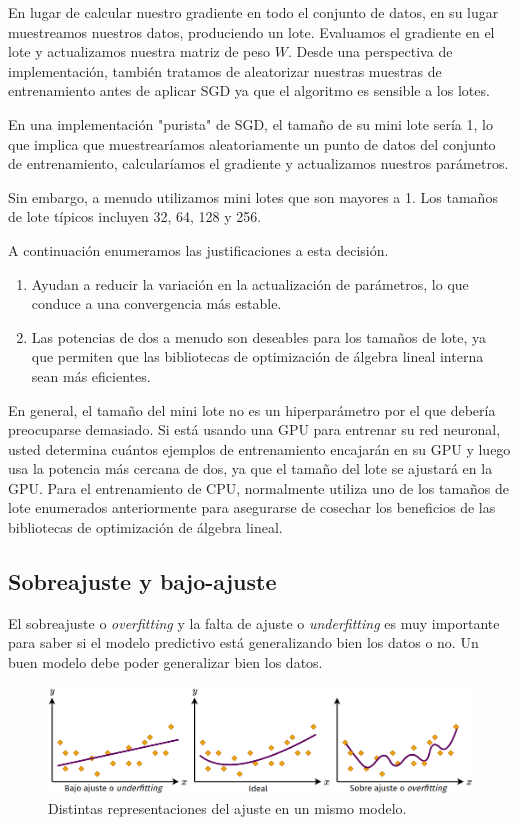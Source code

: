 \documentclass[a4paper,12pt]{article}
\begin{document}
En lugar de calcular nuestro gradiente en todo el conjunto de datos, en su lugar muestreamos nuestros datos, produciendo un lote. Evaluamos el gradiente en el lote y actualizamos nuestra matriz de peso $W$. Desde una perspectiva de implementación, también tratamos de aleatorizar nuestras muestras de entrenamiento antes de aplicar SGD ya que el algoritmo es sensible a los lotes.

En una implementación "purista" de SGD, el tamaño de su mini lote sería 1, lo que implica que muestrearíamos aleatoriamente un punto de datos del conjunto de entrenamiento, calcularíamos el gradiente
y actualizamos nuestros parámetros.

Sin embargo, a menudo utilizamos mini lotes que son mayores a 1. Los tamaños de lote típicos incluyen 32, 64, 128 y 256.

A continuación enumeramos las justificaciones a esta decisión.

\begin{enumerate}[noitemsep, topsep=2pt]
	\item Ayudan a reducir la variación en la actualización de parámetros, lo que conduce a una convergencia más estable. 
	\item Las potencias de dos a menudo son deseables para los tamaños de lote, ya que permiten que las bibliotecas de optimización de álgebra lineal interna sean más eficientes.
\end{enumerate}
En general, el tamaño del mini lote no es un hiperparámetro por el que debería preocuparse demasiado. Si está usando una GPU para entrenar su red neuronal, usted determina cuántos ejemplos de entrenamiento encajarán en su GPU y luego usa la potencia más cercana de dos, ya que el tamaño del lote se ajustará en la GPU. Para el entrenamiento de CPU, normalmente utiliza uno de los tamaños de lote enumerados anteriormente para asegurarse de cosechar los beneficios de las bibliotecas de optimización de álgebra lineal.

\subsection{Sobreajuste y bajo-ajuste}
El sobreajuste o \textit{overfitting} y la falta de ajuste o \textit{underfitting} \cite{quora} es muy importante para saber si el modelo predictivo está generalizando bien los datos o no. Un buen modelo debe poder generalizar bien los datos.

\begin{figure}[H]
	\begin{center}
		\includegraphics[width=1\textwidth]{026.png}
		\caption{Distintas representaciones del ajuste en un mismo modelo.}
		\label{fig:fitting}
	\end{center}
\end{figure}
\end{document}
